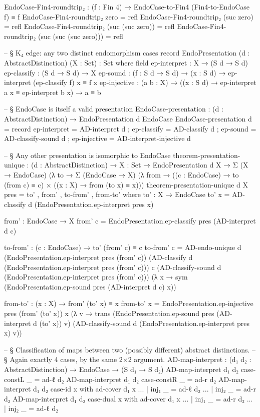 \documentclass[11pt,a4paper]{book}
\begin{document}
\begin{code}
EndoCase-Fin4-roundtrip₂ : (f : Fin 4) → EndoCase-to-Fin4 (Fin4-to-EndoCase f) ≡ f
EndoCase-Fin4-roundtrip₂ zero                      = refl
EndoCase-Fin4-roundtrip₂ (suc zero)                = refl
EndoCase-Fin4-roundtrip₂ (suc (suc zero))          = refl
EndoCase-Fin4-roundtrip₂ (suc (suc (suc zero)))    = refl

-- § K₄ edge: any two distinct endomorphism cases
record EndoPresentation (d : AbstractDistinction) (X : Set) : Set where
  field
    ep-interpret : X → (S d → S d)
    ep-classify  : (S d → S d) → X
    ep-sound     : (f : S d → S d) → (x : S d) →
                   ep-interpret (ep-classify f) x ≡ f x
    ep-injective : (a b : X) →
                   ((x : S d) → ep-interpret a x ≡ ep-interpret b x) →
                   a ≡ b

-- § EndoCase is itself a valid presentation
EndoCase-presentation : (d : AbstractDistinction) → EndoPresentation d EndoCase
EndoCase-presentation d = record
  { ep-interpret = AD-interpret d
  ; ep-classify  = AD-classify d
  ; ep-sound     = AD-classify-sound d
  ; ep-injective = AD-interpret-injective d
  }

-- § Any other presentation is isomorphic to EndoCase
theorem-presentation-unique : (d : AbstractDistinction) →
  {X : Set} → EndoPresentation d X →
  Σ (X → EndoCase) (λ to →
  Σ (EndoCase → X) (λ from →
  ((c : EndoCase) → to (from c) ≡ c) ×
  ((x : X) → from (to x) ≡ x)))
theorem-presentation-unique d {X} pres =
  to' , from' , to-from' , from-to'
  where
    to' : X → EndoCase
    to' x = AD-classify d (EndoPresentation.ep-interpret pres x)

    from' : EndoCase → X
    from' c = EndoPresentation.ep-classify pres (AD-interpret d c)

    to-from' : (c : EndoCase) → to' (from' c) ≡ c
    to-from' c = AD-endo-unique d
      (EndoPresentation.ep-interpret pres (from' c))
      (AD-classify d (EndoPresentation.ep-interpret pres (from' c)))
      c
      (AD-classify-sound d (EndoPresentation.ep-interpret pres (from' c)))
      (λ x → sym (EndoPresentation.ep-sound pres (AD-interpret d c) x))

    from-to' : (x : X) → from' (to' x) ≡ x
    from-to' x = EndoPresentation.ep-injective pres
      (from' (to' x)) x
      (λ v → trans
        (EndoPresentation.ep-sound pres (AD-interpret d (to' x)) v)
        (AD-classify-sound d (EndoPresentation.ep-interpret pres x) v))

-- § Classification of maps between two (possibly different) abstract distinctions.
-- § Again exactly 4 cases, by the same 2×2 argument.
AD-map-interpret : (d₁ d₂ : AbstractDistinction) → EndoCase → (S d₁ → S d₂)
AD-map-interpret d₁ d₂ case-constL _ = ad-ℓ d₂
AD-map-interpret d₁ d₂ case-constR _ = ad-r d₂
AD-map-interpret d₁ d₂ case-id     x with ad-cover d₁ x
... | inj₁ _ = ad-ℓ d₂
... | inj₂ _ = ad-r d₂
AD-map-interpret d₁ d₂ case-dual   x with ad-cover d₁ x
... | inj₁ _ = ad-r d₂
... | inj₂ _ = ad-ℓ d₂


\end{code}
\end{document}
